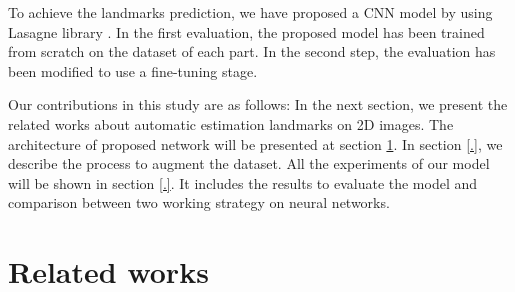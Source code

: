 \documentclass[12pt,a4paper]{article}
\begin{document}
To achieve the landmarks prediction, we have proposed a CNN model \cite{.} by using Lasagne library \cite{.}. In the first evaluation, the proposed model has been trained from scratch on the dataset of each part. In the second step, the evaluation has been modified to use a fine-tuning \cite{.} stage.

Our contributions in this study are as follows: In the next section, we present the related works about automatic estimation landmarks on 2D images. The architecture of proposed network will be presented at section \ref{}. In section \ref{.}, we describe the process to augment the dataset. All the experiments of our model will be shown in section \ref{.}. It includes the results to evaluate the model and comparison between two working strategy on neural networks.

\section{Related works}
\end{document}
